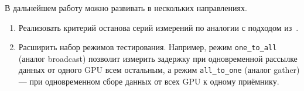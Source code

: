 \documentclass[a4paper,14pt]{extarticle}
\begin{document}
В дальнейшем работу можно развивать в нескольких направлениях.

\begin{enumerate}[leftmargin=2.1cm, itemsep=0.25em, topsep=0.25em, parsep=0pt, partopsep=0pt]
	\item Реализовать критерий останова серий измерений по аналогии с подходом из~\cite{ruscdays23}.
	
	\item Расширить набор режимов тестирования. Например, режим \texttt{one\_to\_all} (аналог broadcast) позволит измерить задержку при одновременной рассылке данных от одного GPU всем остальным, а режим \texttt{all\_to\_one} (аналог gather) --- при одновременном сборе данных от всех GPU к одному приёмнику.
\end{enumerate}

\newpage
{}
\end{document}
